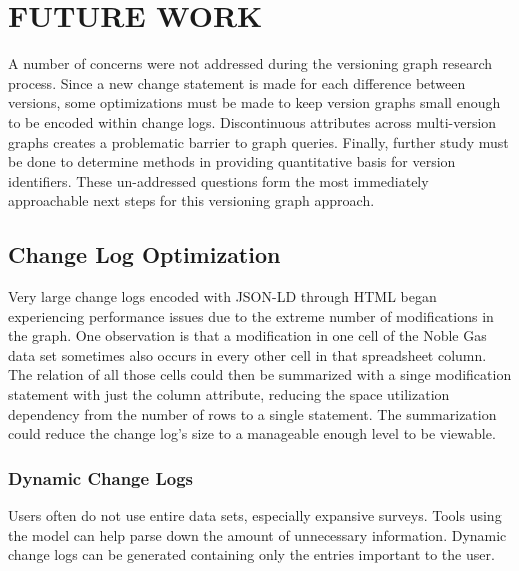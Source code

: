 
\chapter{FUTURE WORK}\label{ch:future}

A number of concerns were not addressed during the versioning graph research process.
Since a new change statement is made for each difference between versions, some optimizations must be made to keep version graphs small enough to be encoded within change logs.
Discontinuous attributes across multi-version graphs creates a problematic barrier to graph queries.
Finally, further study must be done to determine methods in providing quantitative basis for version identifiers.
These un-addressed questions form the most immediately approachable next steps for this versioning graph approach.

\section{Change Log Optimization}

Very large change logs encoded with JSON-LD through HTML began experiencing performance issues due to the extreme number of modifications in the graph.
One observation is that a modification in one cell of the Noble Gas data set sometimes also occurs in every other cell in that spreadsheet column.
The relation of all those cells could then be summarized with a singe modification statement with just the column attribute, reducing the space utilization dependency from the number of rows to a single statement.
The summarization could reduce the change log's size to a manageable enough level to be viewable.

\subsection{Dynamic Change Logs}

Users often do not use entire data sets, especially expansive surveys.
Tools using the model can help parse down the amount of unnecessary information.
Dynamic change logs can be generated containing only the entries important to the user.

